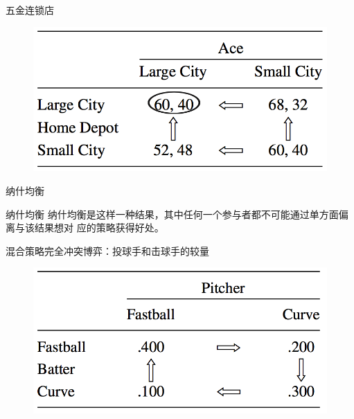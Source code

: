 \documentclass[mathserif, table]{beamer}
\begin{document}
\begin{frame}{五金连锁店}
  
  \begin{figure}
    \includegraphics[width=0.8\textwidth{}]{homeace.png}
  \end{figure}

\end{frame}

\begin{frame}{纳什均衡}

  \begin{block}{纳什均衡}
   纳什均衡是这样一种结果，其中任何一个参与者都不可能通过单方面偏离与该结果想对
   应的策略获得好处。 
  \end{block}
  
\end{frame}

\begin{frame}{混合策略完全冲突博弈：投球手和击球手的较量}

  \begin{figure}
    \includegraphics[width=0.8\textwidth{}]{baseball.png}
  \end{figure}
  
\end{frame}
\end{document}
